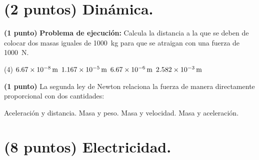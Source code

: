 \documentclass[12pt, letter]{exam}
\begin{document}


\newpage

\begin{questions}
    \section{(2 puntos) Dinámica.}

    \question \textbf{(1 punto)} \label{Problema_01} \textbf{Problema de ejecución: } Calcula la distancia a la que se deben de colocar dos masas iguales de \SI{1000}{\kilo\gram} para que se atraigan con una fuerza de \SI{1000}{\newton}.
    \begin{tasks}(4)
        \task $\SI{6.67d-8}{\meter}$
        \task $\SI{1.167d-5}{\meter}$
        \task $\SI{6.67d-6}{\meter}$
        \task $\SI{2.582d-3}{\meter}$
    \end{tasks}
    \question \textbf{(1 punto)} La segunda ley de Newton relaciona la fuerza de manera directamente proporcional con dos cantidades:
    \begin{multicols}{2}
    \begin{tasks}
        \task Aceleración y distancia.
        \task Masa y peso.
        \task Masa y velocidad.
        \task Masa y aceleración.
    \end{tasks}
    \end{multicols}
    
    \section{(8 puntos) Electricidad.}


\end{questions}
\end{document}
